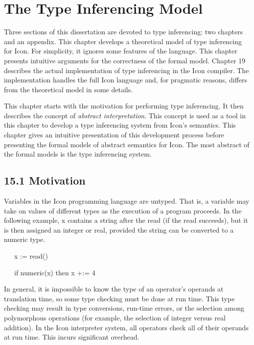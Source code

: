\clearpage\chapter{The Type Inferencing Model}

Three sections of this dissertation are devoted to type inferencing:
two chapters and an appendix. This chapter develops a theoretical
model of type inferencing for Icon. For simplicity, it ignores some
features of the language. This chapter presents intuitive arguments
for the correctness of the formal model. Chapter 19 describes the
actual implementation of type inferencing in the Icon compiler. The
implementation handles the full Icon language and, for pragmatic
reasons, differs from the theoretical model in some details.


This chapter starts with the motivation for performing type
inferencing. It then describes the concept of \textit{abstract
interpretation}. This concept is used as a tool in this chapter to
develop a type inferencing system from Icon's semantics. This chapter
gives an intuitive presentation of this development process before
presenting the formal models of abstract semantics for Icon. The most
abstract of the formal models is the type inferencing system.

\section[15.1 Motivation]{15.1 Motivation}

Variables in the Icon programming language are untyped. That is, a
variable may take on values of different types as the execution of a
program proceeds. In the following example, x contains a string after
the read (if the read succeeds), but it is then assigned an integer or
real, provided the string can be converted to a numeric type.

{\ttfamily\mdseries
\ \ \ x := read()}

{\ttfamily\mdseries
\ \ \ if numeric(x) then x +:= 4}


In general, it is impossible to know the type of an operator's
operands at translation time, so some type checking must be done at
run time. This type checking may result in type conversions, run-time
errors, or the selection among polymorphous operations (for example,
the selection of integer versus real addition). In the Icon
interpreter system, all operators check all of their operands at run
time. This incurs significant overhead.


